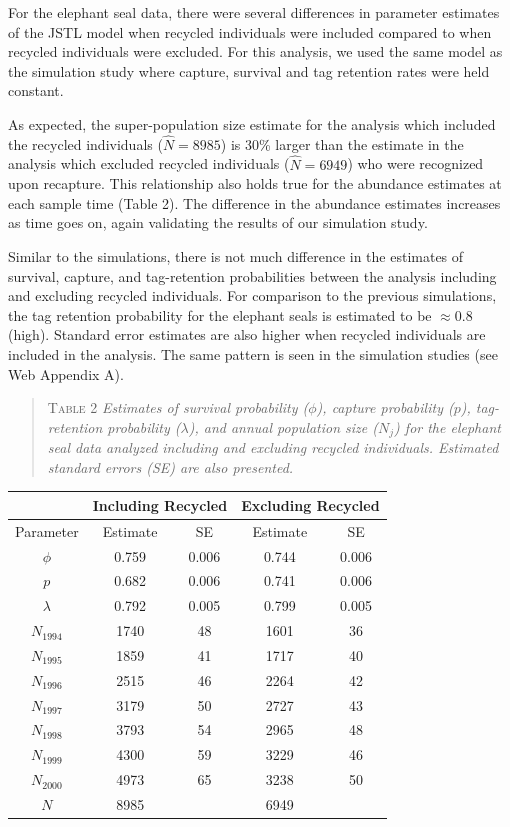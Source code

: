 \documentclass[12pt]{article}
\begin{document}
For the elephant seal data, there were several differences in parameter
estimates of the JSTL model when recycled individuals were included
compared to when recycled individuals were excluded. For this analysis, we used the same model as the simulation study where capture, survival and tag retention rates were held constant.  

As expected, the
super-population size estimate for the analysis which included the
recycled individuals ($\hat{N}=8985$) is 30\% larger than the estimate in the analysis
which excluded recycled individuals ($\hat{N}=6949$) who were recognized upon recapture. This relationship also holds true for the abundance estimates
at each sample time (Table 2). The difference in the abundance estimates increases
 as time goes on, again validating the results of our
simulation study.

Similar to the simulations, there is not much difference in the
estimates of survival, capture, and tag-retention probabilities between the analysis
including and excluding recycled individuals. For comparison to the previous
simulations, the tag retention probability for the
elephant seals is estimated to be $\approx 0.8$ (high).  Standard error estimates are also higher when recycled individuals are included in the analysis. The same pattern is seen in the simulation studies (see Web Appendix A).

\begin{quote}
\textsc{Table 2}
\textsl{Estimates of survival probability ($\phi$), capture probability ($p$), tag-retention probability ($\lambda$), and annual population size ($N_j$) for the elephant seal data analyzed including and excluding recycled individuals. Estimated standard errors (SE) are also presented.}
\end{quote}

\begin{center}
\begin{tabular}{c c c c c}
& \multicolumn{2}{l}{Including Recycled} & \multicolumn{2}{l}{Excluding Recycled} \\ \hline
Parameter & Estimate & SE & Estimate & SE \\ \hline
$\phi$ & 0.759 & 0.006 & 0.744 & 0.006\\
$p$ & 0.682 & 0.006 & 0.741 & 0.006 \\
$\lambda $ & 0.792 & 0.005 & 0.799 & 0.005\\ \hline
$N_{1994}$ & 1740 & 48 & 1601 & 36 \\
$N_{1995}$ & 1859 & 41 & 1717 & 40 \\
$N_{1996}$ & 2515 & 46 & 2264 & 42 \\
$N_{1997}$ & 3179 & 50 & 2727 & 43 \\
$N_{1998}$ & 3793 & 54 & 2965 & 48 \\
$N_{1999}$ & 4300 & 59 & 3229 & 46 \\
$N_{2000}$ & 4973 & 65 & 3238 & 50 \\ \hline
$N$ & 8985 & & 6949 &  \\ \hline
\end{tabular}
\end{center}
\end{document}
